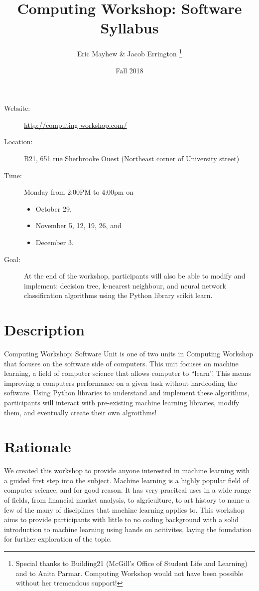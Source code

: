 \documentclass[11pt]{article}
\author{%
  Eric Mayhew \& Jacob Errington%
  \footnote{%
    Special thanks to Building21 (McGill's Office of Student Life and Learning)
    and to Anita Parmar.
    Computing Workshop would not have been possible without her tremendous
    support!
  }
}
\title{Computing Workshop: Software Syllabus}
\date{Fall 2018}
\begin{document}
\maketitle

\begin{description}
  \item[Website:]
    \url{http://computing-workshop.com/}

  \item[Location:]
    B21, 651 rue Sherbrooke Ouest
    (Northeast corner of University street)

  \item[Time:]
    Monday from 2:00PM to 4:00pm on
    \begin{itemize}
    \item October 29,
    \item November 5, 12, 19, 26, and
    \item December 3.
    \end{itemize}

  \item[Goal:]
    At the end of the workshop, participants will also be able to modify and implement: decision tree, k-nearest
    neighbour, and neural network classification algorithms using the Python library scikit learn.

\end{description}

\section*{Description}

Computing Workshop: Software Unit is one of two units in Computing Workshop that
focuses on the software side of computers. This unit focuses on machine
learning, a field of computer science that allows computer to ``learn''. This
means improving a computers performance on a given task without hardcoding the
software. Using Python libraries to understand and implement these algorithms,
participants will interact with pre-existing machine learning libraries, modify
them, and eventually create their own algroithms!

\section*{Rationale}

We created this workshop to provide anyone interested in machine learning with a
guided first step into the subject. Machine learning is a highly popular field
of computer science, and for good reason. It has very pracitcal uses in a wide
range of fields, from financial market analysis, to algriculture, to art history to name a few of the many of
disciplines that machine learning
applies to. This workshop aims to provide participants with little to no coding
background with a solid introduction to machine learning using hands on
acitivites, laying the foundation for further exploration of the topic.
\end{document}

